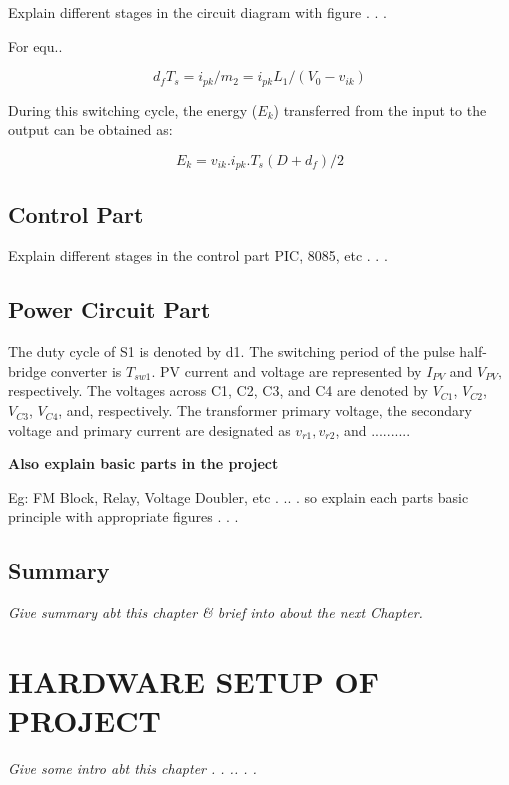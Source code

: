 \documentclass[12 pt, oneside]{book}
\begin{document}
Explain different stages in the circuit diagram with figure . . .

For equ..

\begin{equation}
d_fT_s=i_{pk}/m_2=i_{pk}L_1/(V_0-v_{ik})
\end{equation}

During this switching cycle, the energy ($E_k$) transferred
from the input to the output can be obtained as:

\begin{equation}
E_k=v_{ik}.i_{pk}.T_s(D+d_f)/2
\end{equation}

\section{Control Part}

Explain different stages in the control part PIC, 8085, etc . . . 

\section{Power Circuit Part}

The duty cycle of S1 is denoted by d1. The switching period of the pulse half-bridge converter is $T_{sw1}$. PV current and voltage are represented by $I_{PV}$ and $V_{PV},$ respectively. The voltages across C1, C2, C3, and C4 are denoted by $V_{C1}$, $V_{C2}$, $V_{C3}$, $V_{C4}$, and, respectively. The transformer primary voltage, the secondary voltage and primary current are designated as $v_{r1}, v_{r2}$, and ..........


{\bf Also explain basic parts in the project }  %

Eg: FM Block, Relay, Voltage Doubler, etc  . .. .  so explain each parts basic principle with appropriate figures . . .  

\section{Summary}

{\em Give summary abt this chapter \& brief into about the next Chapter.}


\chapter{HARDWARE SETUP OF PROJECT}


{\em Give some intro abt this chapter . . .. .  . }
\end{document}

